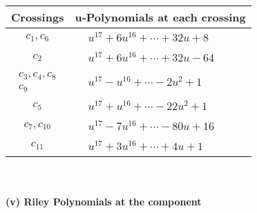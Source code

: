 \documentclass[1p]{elsarticle_modified}
\theoremstyle{definition}
\begin{document}
\begin{tabular}{m{50pt}|m{274pt}}
Crossings & \hspace{64pt}u-Polynomials at each crossing \\
\hline $$\begin{aligned}c_{1},c_{6}\end{aligned}$$&$\begin{aligned}
&u^{17}+6 u^{16}+\cdots+32 u+8
\end{aligned}$\\
\hline $$\begin{aligned}c_{2}\end{aligned}$$&$\begin{aligned}
&u^{17}+6 u^{16}+\cdots+32 u-64
\end{aligned}$\\
\hline $$\begin{aligned}c_{3},c_{4},c_{8}\\c_{9}\end{aligned}$$&$\begin{aligned}
&u^{17}- u^{16}+\cdots-2 u^2+1
\end{aligned}$\\
\hline $$\begin{aligned}c_{5}\end{aligned}$$&$\begin{aligned}
&u^{17}+u^{16}+\cdots-22 u^2+1
\end{aligned}$\\
\hline $$\begin{aligned}c_{7},c_{10}\end{aligned}$$&$\begin{aligned}
&u^{17}-7 u^{16}+\cdots-80 u+16
\end{aligned}$\\
\hline $$\begin{aligned}c_{11}\end{aligned}$$&$\begin{aligned}
&u^{17}+3 u^{16}+\cdots+4 u+1
\end{aligned}$\\
\hline
\end{tabular}\\~\\
\newpage\renewcommand{\arraystretch}{1}
\flushleft \textbf{(v) Riley Polynomials at the component}\newline \\
\end{document}

